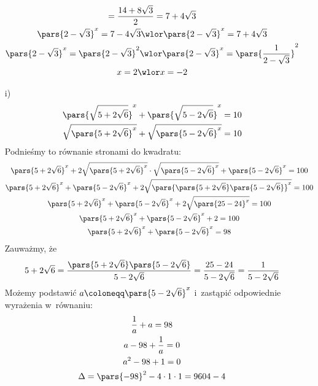 \begin{itemize}
\begin{gather*}
                = \frac{14 + 8\sqrt{3}}{2}
                = 7 + 4\sqrt{3}\\
            \pars{2 - \sqrt{3}}^x = 7 - 4\sqrt{3} \wlor \pars{2 - \sqrt{3}}^x = 7 + 4\sqrt{3}\\
            \pars{2 - \sqrt{3}}^x = \pars{2 - \sqrt{3}}^2 \wlor \pars{2 - \sqrt{3}}^x = \pars{\frac{1}{2 - \sqrt{3}}}^2\\
            x = 2 \wlor x = -2
        \end{gather*}
    \item[i)]
        \begin{gather*}
            \pars{\sqrt{5 + 2\sqrt{6}}}^x + \pars{\sqrt{5 - 2\sqrt{6}}}^x = 10\\
            \sqrt{\pars{5 + 2\sqrt{6}}^x} + \sqrt{\pars{5 - 2\sqrt{6}}^x} = 10\\
        \end{gather*}
        Podnieśmy to równanie stronami do kwadratu:
        \begin{gather*}
            \pars{5 + 2\sqrt{6}}^x + 2\sqrt{\pars{5 + 2\sqrt{6}}^x} \cdot \sqrt{\pars{5 - 2\sqrt{6}}^x} + \pars{5 - 2\sqrt{6}}^x = 100\\
            \pars{5 + 2\sqrt{6}}^x + \pars{5 - 2\sqrt{6}}^x + 2\sqrt{\pars{\pars{5 + 2\sqrt{6}}\pars{5 - 2\sqrt{6}}}^x} = 100\\
            \pars{5 + 2\sqrt{6}}^x + \pars{5 - 2\sqrt{6}}^x + 2\sqrt{\pars{25 - 24}^x} = 100\\
            \pars{5 + 2\sqrt{6}}^x + \pars{5 - 2\sqrt{6}}^x + 2 = 100\\
            \pars{5 + 2\sqrt{6}}^x + \pars{5 - 2\sqrt{6}}^x = 98
        \end{gather*}
        Zauważmy, że
        \begin{equation*}
            5 + 2\sqrt{6}
                = \frac{\pars{5 + 2\sqrt{6}}\pars{5 - 2\sqrt{6}}}{5 - 2\sqrt{6}}
                = \frac{25 - 24}{5 - 2\sqrt{6}}
                = \frac{1}{5 - 2\sqrt{6}}
        \end{equation*}
        Możemy podstawić \(a \coloneqq \pars{5 - 2\sqrt{6}}^x\) i~zastąpić odpowiednie wyrażenia w~równaniu:
        \begin{gather*}
            \frac{1}{a} + a = 98\\
            a - 98 + \frac{1}{a} = 0\\
            a^2 - 98 + 1 = 0\\
            \Delta
                = \pars{-98}^2 - 4 \cdot 1 \cdot 1
                = 9604 - 4

\end{gather*}
\end{itemize}
